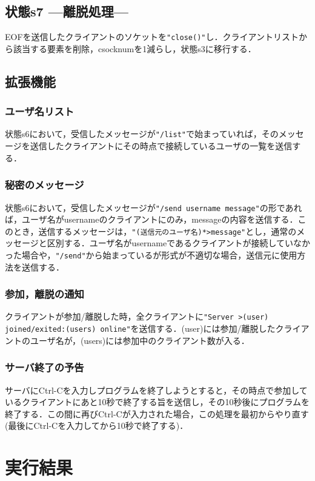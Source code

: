 \documentclass[a4j,10pt,titlepage]{jsarticle}
\begin{document}
\subsection{状態s7 ---離脱処理---}
EOFを送信したクライアントのソケットを\verb|"close()"|し．クライアントリストから該当する要素を削除，csocknumを1減らし，状態s3に移行する．

\subsection{拡張機能}\label{sec:extsrv}
\subsubsection{ユーザ名リスト}
状態s6において，受信したメッセージが\verb|"/list"|で始まっていれば，そのメッセージを送信したクライアントにその時点で接続しているユーザの一覧を送信する．

\subsubsection{秘密のメッセージ}
状態s6において，受信したメッセージが\verb|"/send username message"|の形であれば，ユーザ名がusernameのクライアントにのみ，messageの内容を送信する．このとき，送信するメッセージは，\verb|"(送信元のユーザ名)*>message"|とし，通常のメッセージと区別する．ユーザ名がusernameであるクライアントが接続していなかった場合や，\verb|"/send"|から始まっているが形式が不適切な場合，送信元に使用方法を送信する．

\subsubsection{参加，離脱の通知}
クライアントが参加/離脱した時，全クライアントに\verb|"Server >(user) joined/exited:(users) online"|を送信する．(user)には参加/離脱したクライアントのユーザ名が，(users)には参加中のクライアント数が入る．

\subsubsection{サーバ終了の予告}
サーバにCtrl-Cを入力しプログラムを終了しようとすると，その時点で参加しているクライアントにあと10秒で終了する旨を送信し，その10秒後にプログラムを終了する．この間に再びCtrl-Cが入力された場合，この処理を最初からやり直す(最後にCtrl-Cを入力してから10秒で終了する)．

\section{実行結果}
\end{document}
